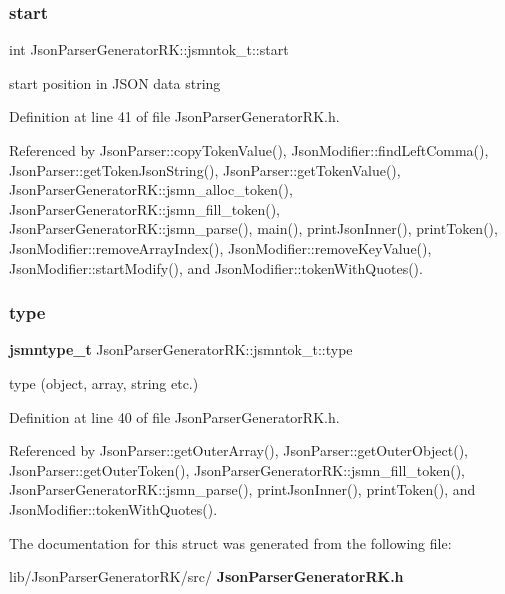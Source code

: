 \mbox{\label{struct_json_parser_generator_r_k_1_1jsmntok__t_a4fb68e88a6a7c366289a92c8b1332f4f}} 
\subsubsection{start}
{\footnotesize\ttfamily int Json\+Parser\+Generator\+R\+K\+::jsmntok\+\_\+t\+::start}



start position in J\+S\+ON data string 



Definition at line 41 of file Json\+Parser\+Generator\+R\+K.\+h.



Referenced by Json\+Parser\+::copy\+Token\+Value(), Json\+Modifier\+::find\+Left\+Comma(), Json\+Parser\+::get\+Token\+Json\+String(), Json\+Parser\+::get\+Token\+Value(), Json\+Parser\+Generator\+R\+K\+::jsmn\+\_\+alloc\+\_\+token(), Json\+Parser\+Generator\+R\+K\+::jsmn\+\_\+fill\+\_\+token(), Json\+Parser\+Generator\+R\+K\+::jsmn\+\_\+parse(), main(), print\+Json\+Inner(), print\+Token(), Json\+Modifier\+::remove\+Array\+Index(), Json\+Modifier\+::remove\+Key\+Value(), Json\+Modifier\+::start\+Modify(), and Json\+Modifier\+::token\+With\+Quotes().

\mbox{\label{struct_json_parser_generator_r_k_1_1jsmntok__t_af74f112dd9655aaa8da0a91e7c8f3495}} 
\subsubsection{type}
{\footnotesize\ttfamily \textbf{ jsmntype\+\_\+t} Json\+Parser\+Generator\+R\+K\+::jsmntok\+\_\+t\+::type}



type (object, array, string etc.) 



Definition at line 40 of file Json\+Parser\+Generator\+R\+K.\+h.



Referenced by Json\+Parser\+::get\+Outer\+Array(), Json\+Parser\+::get\+Outer\+Object(), Json\+Parser\+::get\+Outer\+Token(), Json\+Parser\+Generator\+R\+K\+::jsmn\+\_\+fill\+\_\+token(), Json\+Parser\+Generator\+R\+K\+::jsmn\+\_\+parse(), print\+Json\+Inner(), print\+Token(), and Json\+Modifier\+::token\+With\+Quotes().



The documentation for this struct was generated from the following file\+:\begin{DoxyCompactItemize}
\item 
lib/\+Json\+Parser\+Generator\+R\+K/src/\textbf{ Json\+Parser\+Generator\+R\+K.\+h}\end{DoxyCompactItemize}
